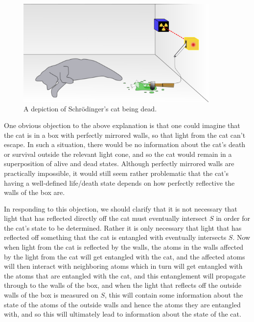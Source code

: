   \begin{figure}[ht!]
    \captionsetup{justification=justified}
    \centering
    \includegraphics[width=100mm]{Chapter03/Schrodingers_deadcat.png}
    \caption[Depiction of Schr\"{o}dinger's dead cat]{A depiction of Schr\"{o}dinger's cat being dead.\protect\footnotemark}
    \label{deadcat}
    \end{figure}
    
One obvious objection to the above explanation is that one could imagine that the cat is in a box with perfectly mirrored walls, so that light from the cat can't escape. In such a situation, there would be no information about the cat's death or survival outside the relevant light cone, and so the cat would remain in a superposition of alive and dead states. Although perfectly mirrored walls are practically impossible, it would still seem rather problematic that the cat's having a well-defined life/death state depends on how perfectly reflective the walls of the box are. 

In responding to this objection, we should clarify that it is not necessary that light that has reflected directly off the cat must eventually intersect $S$ in order for the cat's state to be determined. Rather it is only necessary that light that has reflected off something that the cat is entangled with eventually intersects $S$. Now when light from the cat is reflected by the walls, the atoms in the walls affected by the light from the cat will get entangled with the cat, and the affected atoms will then interact with neighboring atoms which in turn will get entangled with the atoms that are entangled with the cat, and this entanglement will propagate through to the walls of the box, and when the light that reflects off the outside walls of the box is measured on $S$, this will contain some information about the state of the atoms of the outside walls and hence the atoms they are entangled with, and so this will ultimately lead to information about the state of the cat. 
    
